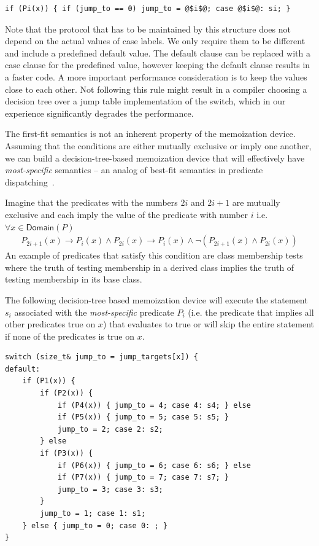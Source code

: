 \begin{lstlisting}
if (Pi(x)) { if (jump_to == 0) jump_to = @$i$@; case @$i$@: si; }
\end{lstlisting}

\noindent
Note that the protocol that has to be maintained by this structure does not 
depend on the actual values of case labels. We only require them to be 
different and include a predefined default value. The default clause can be 
replaced with a case clause for the predefined value, however keeping the default  
clause results in a faster code. A more important performance consideration is to 
keep the values close to each other. Not following this rule might result in a 
compiler choosing a decision tree over a jump table implementation of the 
switch, which in our experience significantly degrades the performance.

The first-fit semantics is not an inherent property of the memoization device. 
Assuming that the conditions are either mutually exclusive or imply one another, we 
can build a decision-tree-based memoization device that will effectively have 
\emph{most-specific} semantics -- an analog of best-fit semantics in predicate 
dispatching~\cite{ErnstKC98}.

Imagine that the predicates with the numbers $2i$ and $2i+1$ are mutually exclusive and 
each imply the value of the predicate with number $i$ i.e. $\forall x \in \mathsf{Domain}(P)$
\begin{eqnarray*}
P_{2i+1}(x)\rightarrow P_i(x)\wedge P_{2i}(x)\rightarrow P_i(x)\wedge\neg(P_{2i+1}(x)\wedge P_{2i}(x))
\end{eqnarray*}
\noindent
An example of predicates that satisfy this condition are class membership tests 
where the truth of testing membership in a derived class implies the truth of 
testing membership in its base class. 

The following decision-tree based memoization device will execute the statement 
$s_i$ associated with the \emph{most-specific} predicate $P_i$ (i.e. the 
predicate that implies all other predicates true on $x$) that evaluates to true 
or will skip the entire statement if none of the predicates is true on $x$.

\begin{lstlisting}
switch (size_t& jump_to = jump_targets[x]) {
default:
    if (P1(x)) {
        if (P2(x)) {
            if (P4(x)) { jump_to = 4; case 4: s4; } else
            if (P5(x)) { jump_to = 5; case 5: s5; } 
            jump_to = 2; case 2: s2;
        } else
        if (P3(x)) {
            if (P6(x)) { jump_to = 6; case 6: s6; } else
            if (P7(x)) { jump_to = 7; case 7: s7; } 
            jump_to = 3; case 3: s3;
        }
        jump_to = 1; case 1: s1;
    } else { jump_to = 0; case 0: ; }
}
\end{lstlisting}

